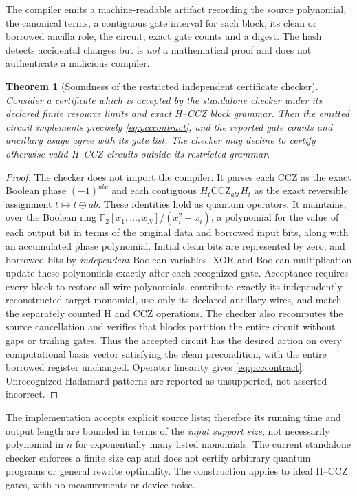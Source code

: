 \documentclass[11pt,a4paper]{article}
\newtheorem{theorem}{Theorem}
\begin{document}
The compiler emits a machine-readable artifact
recording the source polynomial, the canonical
terms, a contiguous gate interval for each
block, its clean or borrowed ancilla role,
the circuit, exact gate counts and a digest.
The hash detects accidental changes but is
\emph{not} a mathematical proof and does not
authenticate a malicious compiler.

\begin{theorem}[Soundness of the restricted
independent certificate checker]\label{thm:checker}
Consider a certificate which is accepted by
the standalone checker under its declared
finite resource limits and exact
H--CCZ block grammar. Then the emitted
circuit implements precisely
\eqref{eq:pcccontract}, and the reported
gate counts and ancillary usage agree with
its gate list. The checker may decline
to certify otherwise valid H--CCZ circuits
outside its restricted grammar.
\end{theorem}
\begin{proof}
The checker does not import the compiler.
It parses each CCZ as the exact Boolean
phase $(-1)^{abc}$ and each contiguous
$H_t\mathrm{CCZ}_{abt}H_t$ as the exact
reversible assignment $t\mapsto t\oplus ab$.
These identities hold as quantum operators.
It maintains, over the Boolean ring
$\mathbb F_2[x_1,\ldots,x_N]/(x_i^2-x_i)$,
a polynomial for the value of each output
bit in terms of the original data and
borrowed input bits, along with an
accumulated phase polynomial.
Initial clean bits are represented by
zero, and borrowed bits by \emph{independent}
Boolean variables. XOR and Boolean
multiplication update these polynomials
exactly after each recognized gate.
Acceptance requires every block to restore
all wire polynomials, contribute exactly
its independently reconstructed target
monomial, use only its declared ancillary
wires, and match the separately counted
H and CCZ operations. The checker also
recomputes the source cancellation and
verifies that blocks partition the
entire circuit without gaps or trailing
gates. Thus the accepted circuit has
the desired action on every computational
basis vector satisfying the clean
precondition, with the entire borrowed
register unchanged. Operator linearity
gives \eqref{eq:pcccontract}.
Unrecognized Hadamard patterns are reported
as unsupported, not asserted incorrect.
\end{proof}

The implementation accepts explicit source
lists; therefore its running time and
output length are bounded in terms of the
\emph{input support size}, not necessarily
polynomial in $n$ for exponentially many
listed monomials. The current standalone
checker enforces a finite size cap and
does not certify arbitrary quantum
programs or general rewrite optimality.
The construction applies to ideal
H--CCZ gates, with no measurements or
device noise.
\end{document}
